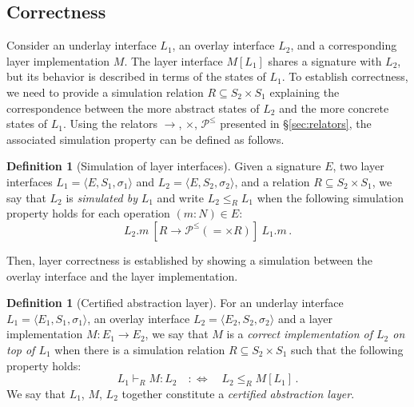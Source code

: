 \documentclass[draft,11pt]{report}
\theoremstyle{definition}
\newtheorem{definition}[theorem]{Definition}
\begin{document}

\subsection{Correctness} %

Consider an underlay interface $L_1$,
an overlay interface $L_2$,
and a corresponding layer implementation $M$.
The layer interface $M[L_1]$
shares a signature with $L_2$,
but its behavior is described in terms of
the states of $L_1$.
To establish correctness,
we need to provide a simulation relation
$R \subseteq S_2 \times S_1$
explaining the correspondence between
the more abstract states of $L_2$ and
the more concrete states of $L_1$.
Using the relators $\rightarrow$, $\times$, $\mathcal{P}^\le$
presented in \S\ref{sec:relators},
the associated simulation property can be defined as follows.

\begin{definition}[Simulation of layer interfaces] %
Given a signature $E$,
two layer interfaces
$L_1 = \langle E, S_1, \sigma_1 \rangle$ and
$L_2 = \langle E, S_2, \sigma_2 \rangle$,
and a relation $R \subseteq S_2 \times S_1$,
we say that $L_2$ is \emph{simulated by} $L_1$
and write $L_2 \le_R L_1$ when
the following simulation property holds
for each operation $(m : N) \in E$:
\begin{equation}
  \label{eqn:sim}
  L_2.m
  \: \mathrel{[R \rightarrow \mathcal{P}^\le({=} \times R)]} \:
  L_1.m \,.
\end{equation}
\end{definition}

Then, layer correctness is established by showing
a simulation between the overlay interface
and the layer implementation.

\begin{definition}[Certified abstraction layer] %
For an underlay interface $L_1 = \langle E_1, S_1, \sigma_1 \rangle$,
an overlay interface $L_2 = \langle E_2, S_2, \sigma_2 \rangle$ and
a layer implementation $M : E_1 \rightarrow E_2$,
we say that $M$ is a
\emph{correct implementation of $L_2$ on top of $L_1$}
when there is a simulation relation $R \subseteq S_2 \times S_1$
such that the following property holds:
\[
  L_1 \vdash_R M : L_2 \quad :\Leftrightarrow \quad
  L_2 \le_R M[L_1] \,.
\]
We say that $L_1$, $M$, $L_2$ together
constitute a \emph{certified abstraction layer}.
\end{definition}
\end{document}

